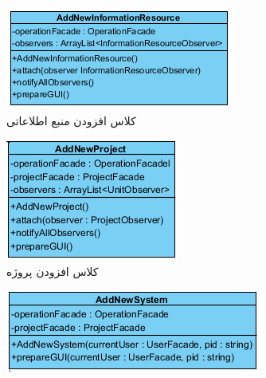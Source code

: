 \begin{figure}[H]
\begin{subfigure}[b]{0.3\textwidth}
	\end{subfigure}
	\hfill
	\begin{subfigure}[b]{0.3\textwidth}
		\includegraphics[width=\textwidth]{img/class-design/ui/AddNewInformationResource}
		\caption{کلاس افزودن منبع اطلاعاتی}
	\end{subfigure}
	\hfill
	\begin{subfigure}[b]{0.3\textwidth}
		\includegraphics[width=\textwidth]{img/class-design/ui/AddNewProject}
		\caption{کلاس افزودن پروژه}
	\end{subfigure}
	\begin{subfigure}[b]{0.3\textwidth}
		\includegraphics[width=\textwidth]{img/class-design/ui/AddNewSystem}

\end{subfigure}
\end{figure}
